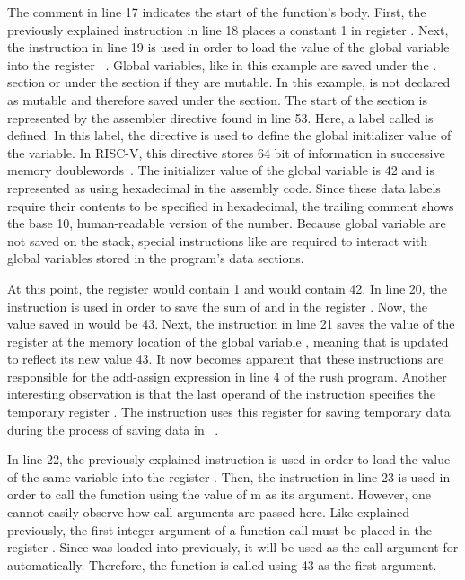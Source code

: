 The comment in line 17 indicates the start of the function's body.
First, the previously explained  instruction in line 18 places a constant 1 in register .
Next, the  instruction in line 19 is used in order to load the value of the global variable  into the register ~\cite[reference]{Patterson2017}.
Global variables, like  in this example are saved under the . section or under the  section if they are mutable.
In this example,  is not declared as mutable and therefore saved under the  section.
The start of the  section is represented by the  assembler directive found in line 53.
Here, a label called  is defined.
In this label, the  directive is used to define the global initializer value of the variable.
In RISC-V, this directive stores 64 bit of information in successive memory doublewords~\cite[p.~39]{Patterson2017}.
The initializer value of the global variable is 42 and is represented as  using hexadecimal in the assembly code.
Since these data labels require their contents to be specified in hexadecimal, the trailing comment shows the base 10, human-readable version of the number.
Because global variable are not saved on the stack, special instructions like  are required to interact with global variables stored in the program's data sections.

At this point, the register  would contain 1 and  would contain 42.
In line 20, the  instruction is used in order to save the sum of  and  in the register .
Now, the value saved in  would be 43.
Next, the  instruction in line 21 saves the value of the register  at the memory location of the global variable , meaning that  is updated to reflect its new value 43.
It now becomes apparent that these instructions are responsible for the add-assign expression in line 4 of the rush program.
Another interesting observation is that the last operand of the  instruction specifies the temporary register .
The instruction uses this register for saving temporary data during the process of saving data in ~\cite[reference]{Patterson2017}.

In line 22, the previously explained  instruction is used in order to load the value of the same variable into the register .
Then, the  instruction in line 23 is used in order to call the  function using the value of m as its argument.
However, one cannot easily observe how call arguments are passed here.
Like explained previously, the first integer argument of a function call must be placed in the register .
Since  was loaded into  previously, it will be used as the call argument for  automatically.
Therefore, the  function is called using 43 as the first argument.

